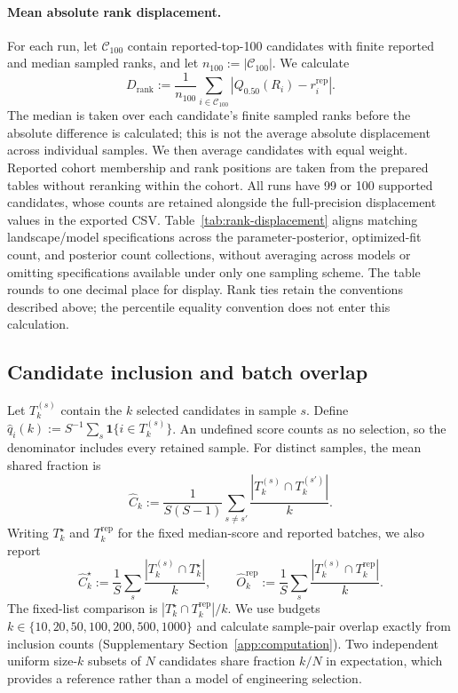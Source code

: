 \paragraph{Mean absolute rank displacement.}
For each run, let $\mathcal C_{100}$ contain reported-top-100 candidates
with finite reported and median sampled ranks, and let
$n_{100}:=|\mathcal C_{100}|$. We calculate
\[
D_{\mathrm{rank}}:=\frac{1}{n_{100}}\sum_{i\in\mathcal C_{100}}
\left|Q_{0.50}(R_i)-r_i^{\mathrm{rep}}\right|.
\]
The median is taken over each candidate's finite sampled ranks before
the absolute difference is calculated; this is not the average absolute
displacement across individual samples. We then average candidates with
equal weight. Reported cohort membership and rank positions are taken
from the prepared tables without reranking within the cohort. All runs
have 99 or 100 supported candidates, whose counts are retained alongside
the full-precision displacement values in the exported CSV.
Table~\ref{tab:rank-displacement} aligns matching landscape/model
specifications across the parameter-posterior, optimized-fit count,
and posterior count collections, without averaging across models or
omitting specifications available under only one sampling scheme.
The table rounds to one decimal place for display. Rank ties retain
the conventions described above; the percentile equality convention
does not enter this calculation.

\subsection{Candidate inclusion and batch overlap}

Let $T_k^{(s)}$ contain the $k$ selected candidates in sample $s$.
Define $\hat q_i(k):=S^{-1}\sum_s\mathbf1\{i\in T_k^{(s)}\}$.
An undefined score counts as no selection, so the denominator
includes every retained sample. For distinct samples, the mean
shared fraction is
\[
\widehat C_k:=\frac{1}{S(S-1)}\sum_{s\ne s'}
\frac{|T_k^{(s)}\cap T_k^{(s')}|}{k}.
\]
Writing $T_k^\star$ and $T_k^{\mathrm{rep}}$ for the fixed
median-score and reported batches, we also report
\[
\widehat C_k^\star:=\frac{1}{S}\sum_s
\frac{|T_k^{(s)}\cap T_k^\star|}{k},\qquad
\widehat O_k^{\mathrm{rep}}:=\frac{1}{S}\sum_s
\frac{|T_k^{(s)}\cap T_k^{\mathrm{rep}}|}{k}.
\]
The fixed-list comparison is $|T_k^\star\cap T_k^{\mathrm{rep}}|/k$.
We use budgets $k\in\{10,20,50,100,200,500,1000\}$ and calculate
sample-pair overlap exactly from inclusion counts
(Supplementary Section~\ref{app:computation}). Two independent
uniform size-$k$ subsets of $N$ candidates share fraction $k/N$
in expectation, which provides a reference rather than a model
of engineering selection.

